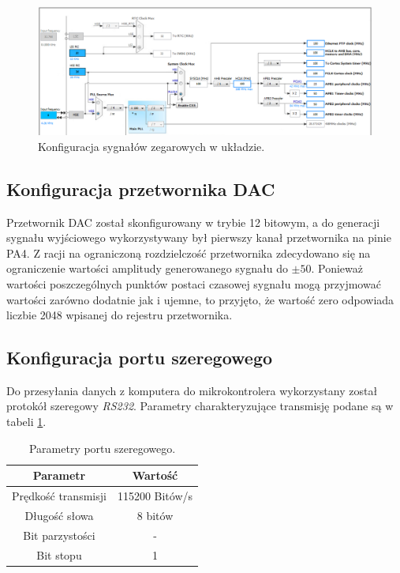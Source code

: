 \begin{figure}[h!]
	\centering
	\includegraphics[scale = 0.5]{fig/clock.png}
	\caption		
	{Konfiguracja sygnałów zegarowych w układzie.}
	\label{stmclock}
\end{figure}

\subsection{Konfiguracja przetwornika DAC}
Przetwornik DAC został skonfigurowany w trybie 12 bitowym, a do generacji sygnału wyjściowego wykorzystywany był pierwszy kanał przetwornika na pinie PA4. Z racji na ograniczoną rozdzielczość przetwornika zdecydowano się na ograniczenie wartości amplitudy generowanego sygnału do $\pm 50$. Ponieważ wartości poszczególnych punktów postaci czasowej sygnału mogą przyjmować wartości zarówno dodatnie jak i ujemne, to przyjęto, że wartość zero odpowiada liczbie 2048 wpisanej do rejestru przetwornika.   
\subsection{Konfiguracja portu szeregowego}

Do przesyłania danych z komputera do mikrokontrolera wykorzystany został protokół szeregowy \textit{RS232}. Parametry charakteryzujące transmisję podane są w tabeli \ref{tab_rs232}.

\begin{table}[h]
	\caption{Parametry portu szeregowego.}
	\label{tab_rs232}
	\centering
	
	\begin{tabular}{|c|c|}
		\hline
		\textbf{Parametr} & \textbf{Wartość}\\
		\hline
		Prędkość transmisji & 115200 Bitów/s \\
		\hline
		Długość słowa & 8 bitów \\
		\hline
		Bit parzystości & - \\
		\hline
		Bit stopu & 1 \\
		\hline
	\end{tabular}
\end{table}   